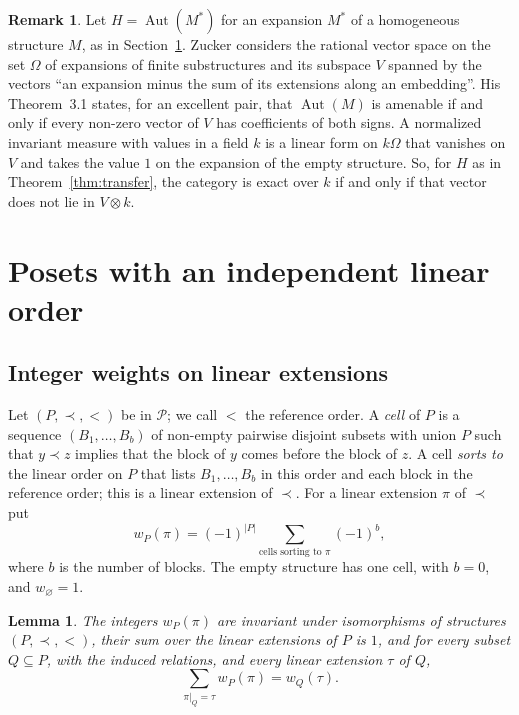 \documentclass[11pt,a4paper]{article}
\newtheorem{lemma}[theorem]{Lemma}
\theoremstyle{definition}
\newtheorem{remark}[theorem]{Remark}
\newcommand{\Po}{\mathcal{P}}
\newcommand{\Aut}{\operatorname{Aut}}
\begin{document}
\begin{remark}\label{rem:zucker}
Let $H=\Aut(M^*)$ for an expansion $M^*$ of a homogeneous structure $M$, as
in Section~\ref{sec:posets}. Zucker \cite[\S3]{Zu} considers the rational
vector space on the set $\Omega$ of expansions of finite substructures and
its subspace $V$ spanned by the vectors ``an expansion minus the sum of its
extensions along an embedding''. His Theorem~3.1 states, for an excellent
pair, that $\Aut(M)$ is amenable if and only if every non-zero vector of $V$
has coefficients of both signs. A normalized invariant measure with values
in a field $k$ is a linear form on $k\Omega$ that vanishes on $V$ and takes
the value $1$ on the expansion of the empty structure. So, for $H$ as in
Theorem~\ref{thm:transfer}, the category is exact over $k$ if and only if
that vector does not lie in $V\otimes k$.
\end{remark}

\section{Posets with an independent linear order}\label{sec:posets}

\subsection{Integer weights on linear extensions}

Let $(P,\prec,<)$ be in $\Po$; we call $<$ the reference order. A
\emph{cell} of $P$ is a sequence $(B_1,\dots,B_b)$ of non-empty pairwise
disjoint subsets with union $P$ such that $y\prec z$ implies that the block
of $y$ comes before the block of $z$. A cell \emph{sorts to} the linear
order on $P$ that lists $B_1,\dots,B_b$ in this order and each block in the
reference order; this is a linear extension of $\prec$. For a linear
extension $\pi$ of $\prec$ put
\[
 w_P(\pi)=(-1)^{|P|}\sum_{\text{cells sorting to }\pi}(-1)^{b},
\]
where $b$ is the number of blocks. The empty structure has one cell, with
$b=0$, and $w_\varnothing=1$.

\begin{lemma}\label{lem:weights}
The integers $w_P(\pi)$ are invariant under isomorphisms of structures
$(P,\prec,<)$, their sum over the linear extensions of $P$ is $1$, and for
every subset $Q\subseteq P$, with the induced relations, and every linear
extension $\tau$ of $Q$,
\[
 \sum_{\pi|_Q=\tau}w_P(\pi)=w_Q(\tau).
\]
\end{lemma}
\end{document}
